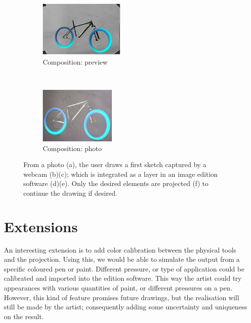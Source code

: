 \documentclass{article}
\begin{document}
\begin{figure}[!htb]
\begin{subfigure}[b]{0.20\textwidth}
                \label{fig:gimp1}
        \end{subfigure}
        \\
        \begin{subfigure}[b]{0.20\textwidth}
                \centering
                \includegraphics[height= 2.8cm]{mix2}
                \caption{Composition: preview}
                \label{fig:gimp2}
        \end{subfigure}
        ~ \hspace{4mm}
        \begin{subfigure}[b]{0.20\textwidth}
                \centering
                \includegraphics[height= 2.8cm]{velo2}
                \caption{Composition: photo}
                \label{fig:proj}
        \end{subfigure}
        \caption{From a photo (a), the user draws a first sketch captured by a webcam (b)(c); which is integrated as a layer in an image edition software (d)(e). Only the desired elements are projected (f) to continue the drawing if desired.}\label{fig:velo6illu}
\end{figure}


\section{Extensions}

An interesting extension is to add color calibration between the physical tools and the projection. Using this, we would be able to simulate the output from a specific coloured pen or paint. Different pressure, or type of application could be calibrated and imported into the edition software. This way the artist could try appearances with various quantities of paint, or different pressures on a pen. However, this kind of feature promises future drawings, but the realisation will still be made by the artist; consequently adding some uncertainty and uniqueness on the result. 
\end{document}
